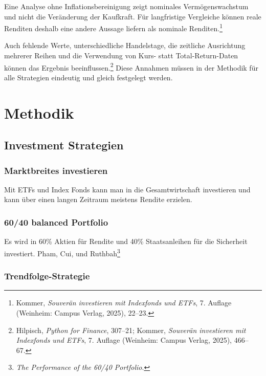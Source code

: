 \documentclass[
  ngerman,
  a4paper,
  DIV=11,
  oneside]{scrreprt}
\begin{document}
Eine Analyse ohne Inflationsbereinigung zeigt nominales
Vermögenswachstum und nicht die Veränderung der Kaufkraft. Für
langfristige Vergleiche können reale Renditen deshalb eine andere
Aussage liefern als nominale Renditen.\footnote{Kommer, \emph{Souverän
  investieren mit Indexfonds und ETFs}, 7. Auflage (Weinheim: Campus
  Verlag, 2025), 22--23.}

Auch fehlende Werte, unterschiedliche Handelstage, die zeitliche
Ausrichtung mehrerer Reihen und die Verwendung von Kurs- statt
Total-Return-Daten können das Ergebnis beeinflussen.\footnote{Hilpisch,
  \emph{Python for Finance}, 307--21; Kommer, \emph{Souverän investieren
  mit Indexfonds und ETFs}, 7. Auflage (Weinheim: Campus Verlag, 2025),
  466--67.} Diese Annahmen müssen in der Methodik für alle Strategien
eindeutig und gleich festgelegt werden.


\chapter{Methodik}\label{methodik}

\section{Investment Strategien}\label{investment-strategien}

\subsection{Marktbreites investieren}\label{marktbreites-investieren}

Mit ETFs und Index Fonds kann man in die Gesamtwirtschaft investieren
und kann über einen langen Zeitraum meistens Rendite erzielen.

\subsection{60/40 balanced Portfolio}\label{balanced-portfolio}

Es wird in 60\% Aktien für Rendite und 40\% Staatsanleihen für die
Sicherheit investiert. Pham, Cui, und Ruthbah\footnote{\emph{The
  {Performance} of the 60/40 {Portfolio}}.}

\subsection{Trendfolge-Strategie}\label{trendfolge-strategie}
\end{document}
